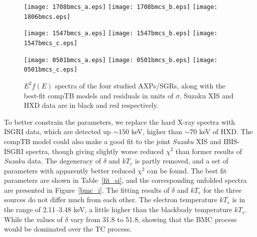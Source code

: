 \documentclass[]{raa}
\begin{document}
\begin{figure}
     \texttt{[image: 1708bmcs\_a.eps]}
     \texttt{[image: 1708bmcs\_b.eps]}
     \texttt{[image: 1806bmcs.eps]}

     \texttt{[image: 1547bmcs\_a.eps]}
     \texttt{[image: 1547bmcs\_b.eps]}
     \texttt{[image: 1547bmcs\_c.eps]}
     
     \texttt{[image: 0501bmcs\_a.eps]}
     \texttt{[image: 0501bmcs\_b.eps]}
     \texttt{[image: 0501bmcs\_c.eps]}

   \caption{$E^2f(E)$ spectra of the four studied AXPs/SGRs, along with the best-fit compTB models and residuals in units of $\sigma$. Suzaku XIS and HXD data are in black and red respectively.}
   \label{bmc_s}
   \end{figure}


To better constrain the parameters, we replace the hard X-ray spectra with ISGRI data, which are detected up $\sim 150$ keV, higher than $\sim 70$ keV of HXD.
%
The compTB model could also make a good fit to the joint {\it Suzaku} XIS and IBIS-ISGRI spectra, though giving slightly worse reduced $\chi^2$ than former results of {\it Suzaku} data.
%
The degeneracy of $\delta$ and $kT_e$ is partly removed, and a set of parameters with apparently better reduced $\chi^2$ can be found.
%
The best fit parameters are shown in Table~\ref{fit_si},  and the corresponding unfolded spectra are presented in Figure~\ref{bmc_i}.
%
The fitting results of $\delta$ and $kT_e$ for the three sources do not differ much from each other.
%
The electron temperature $kT_e$ is in the range of 2.11--3.48 keV, a little higher than the blackbody temperature $kT_s$.
%
While the values of $\delta$ vary from 31.8 to 51.8, showing that the BMC process would be dominated over the TC process.
\end{document}
